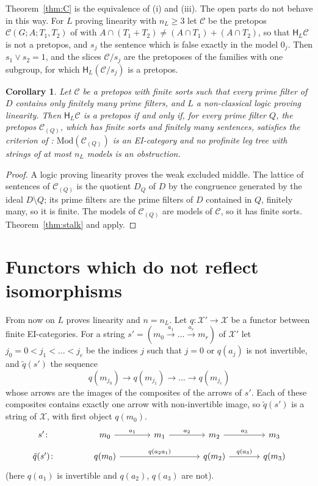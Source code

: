 \documentclass[11pt]{amsart}
\newtheorem{cor}[thm]{Corollary}
\theoremstyle{definition}
\newcommand{\Mod}{\mathrm{Mod}}
\newcommand{\HH}{\mathsf H}
\newcommand{\cX}{\mathcal X}
\newcommand{\cC}{\mathcal C}
\begin{document}
Theorem~\ref{thm:C} is the equivalence of (i) and (iii). The open
parts do not behave in this way. For $L$ proving linearity with
$n_L\ge3$ let $\cC$ be the
pretopos $\cC(G;A;T_1,T_2)$ of \cite[Thm.~1.2]{Proftrees} with
$A\cap(T_1+T_2)\ne(A\cap T_1)+(A\cap T_2)$, so that $\HH_L\cC$ is not
a pretopos, and $s_j$ the sentence which is false exactly in the model
$0_j$. Then $s_1\vee s_2=1$, and the slices $\cC/s_j$ are the
pretoposes of the families with one subgroup, for which
$\HH_L(\cC/s_j)$ is a pretopos.

\begin{cor}\label{cor:locfin}
Let $\cC$ be a pretopos with finite sorts such that every prime filter
of $D$ contains only finitely many prime filters, and $L$ a
non-classical logic proving linearity. Then $\HH_L\cC$ is a pretopos
if and only if, for every prime filter $Q$, the pretopos $\cC_{(Q)}$,
which has finite sorts and finitely many sentences, satisfies the
criterion of \cite[Thm.~1.1]{Proftrees}: $\Mod(\cC_{(Q)})$ is an
EI-category and no profinite leg tree with strings of at most $n_L$
models is an obstruction.
\end{cor}
\begin{proof}
A logic proving linearity proves the weak excluded middle. The lattice
of sentences of $\cC_{(Q)}$ is the quotient $D_Q$ of $D$ by the
congruence generated by the ideal $D\setminus Q$; its prime filters
are the prime filters of $D$ contained in $Q$, finitely many, so it is
finite. The models of $\cC_{(Q)}$ are models of $\cC$, so it has
finite sorts. Theorem~\ref{thm:stalk} and
\cite[Thm.~1.1]{Proftrees} apply.
\end{proof}

\section{Functors which do not reflect isomorphisms}\label{sec:collapse}

From now on $L$ proves linearity and $n=n_L$. Let $q\colon\cX'\to\cX$
be a functor between finite EI-categories. For a string
$s'=(m_0\xrightarrow{a_1}\dots\xrightarrow{a_r}m_r)$ of $\cX'$ let
$j_0=0<j_1<\dots<j_e$ be the indices $j$ such that $j=0$ or $q(a_j)$
is not invertible, and $\tilde q(s')$ the sequence
\[
q(m_{j_0})\to q(m_{j_1})\to\dots\to q(m_{j_e})
\]
whose arrows are the images of the composites of the arrows of $s'$.
Each of these composites contains exactly one arrow with
non-invertible image, so $\tilde q(s')$ is a string of $\cX$, with
first object $q(m_0)$.
\[
\begin{tikzcd}[column sep=large,row sep=small]
s'\colon&m_0\ar[r,"a_1"]&m_1\ar[r,"a_2"]&m_2\ar[r,"a_3"]&m_3\\
\tilde q(s')\colon&q(m_0)\ar[rr,"q(a_2a_1)"]&&q(m_2)\ar[r,"q(a_3)"]&q(m_3)
\end{tikzcd}
\]
(here $q(a_1)$ is invertible and $q(a_2)$, $q(a_3)$ are not).
\end{document}
